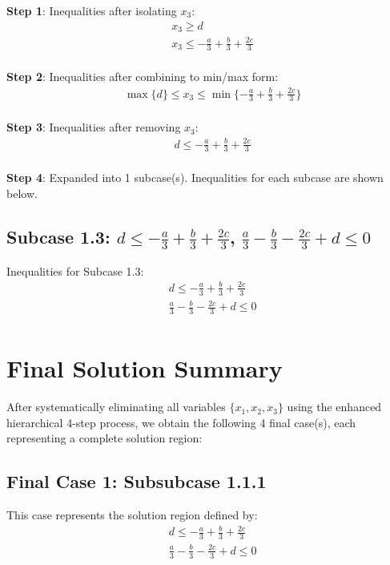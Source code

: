 \documentclass{article}
\begin{document}
\textbf{Step 1}: Inequalities after isolating $x_{3}$:
\begin{align}
& x_{3} \geq d \\
& x_{3} \leq - \frac{a}{3} + \frac{b}{3} + \frac{2 c}{3} \\
\end{align}

\textbf{Step 2}: Inequalities after combining to min/max form:
\begin{align}
& \max\{d\} \leq x_{3} \leq \min\{- \frac{a}{3} + \frac{b}{3} + \frac{2 c}{3}\} \\
\end{align}

\textbf{Step 3}: Inequalities after removing $x_{3}$:
\begin{align}
& d \leq - \frac{a}{3} + \frac{b}{3} + \frac{2 c}{3} \\
\end{align}

\textbf{Step 4}: Expanded into 1 subcase(s). Inequalities for each subcase are shown below.

\subsection{Subcase 1.3: $d \leq - \frac{a}{3} + \frac{b}{3} + \frac{2 c}{3}$, $\frac{a}{3} - \frac{b}{3} - \frac{2 c}{3} + d \leq 0$}

Inequalities for Subcase 1.3:
\begin{align}
& d \leq - \frac{a}{3} + \frac{b}{3} + \frac{2 c}{3} \\
& \frac{a}{3} - \frac{b}{3} - \frac{2 c}{3} + d \leq 0 \\
\end{align}

\section{Final Solution Summary}

After systematically eliminating all variables $\{x_{1}, x_{2}, x_{3}\}$
using the enhanced hierarchical 4-step process, we obtain the following
4 final case(s), each representing a complete solution region:

\subsection{Final Case 1: Subsubcase 1.1.1}

This case represents the solution region defined by:
\begin{align}
& d \leq - \frac{a}{3} + \frac{b}{3} + \frac{2 c}{3} \\
& \frac{a}{3} - \frac{b}{3} - \frac{2 c}{3} + d \leq 0 \\
\end{align}
\end{document}
